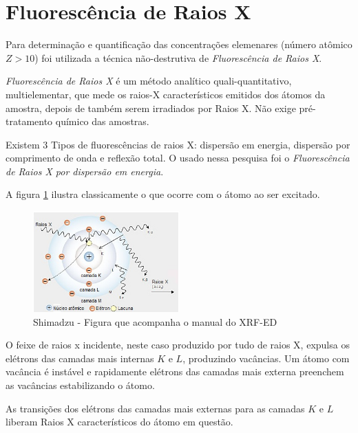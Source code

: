 \section{Fluorescência de Raios X}

Para determinação e quantificação das concentrações elemenares (número atômico $Z>10$)
foi utilizada a técnica não-destrutiva de \textit{Fluorescência de Raios X}.

\textit{Fluorescência de Raios X} é um método analítico quali-quantitativo, 
multielementar, que mede os raios-X característicos emitidos dos átomos da amostra, 
depois de também serem irradiados por Raios X. Não exige pré-tratamento químico
das amostras.

Existem 3 Tipos de fluorescências de raios X: dispersão em energia,
dispersão por comprimento de onda e reflexão total.
O usado nessa pesquisa foi o 
\textit{Fluorescência de Raios X por dispersão em energia}.

A figura \ref{fig:shimadzu_atomo} ilustra classicamente o que ocorre com
o átomo ao ser excitado.

\begin{figure}[H]
\begin{center} 
  \includegraphics[width=0.5\textwidth]{../inputs/images/shimadzu_atomo.jpg}
  \caption{Shimadzu - Figura que acompanha o manual do XRF-ED \label{fig:shimadzu_atomo}}
\end{center}
\end{figure}

O feixe de raios x incidente, neste caso produzido por tudo de raios X, 
expulsa os elétrons das camadas mais internas $K$ e $L$, produzindo vacâncias. 
Um átomo com vacância é instável e rapidamente elétrons das camadas 
mais externa preenchem as vacâncias estabilizando o átomo.

As transições dos elétrons das camadas mais externas para as camadas
$K$ e $L$ liberam Raios X característicos do átomo em questão. 

